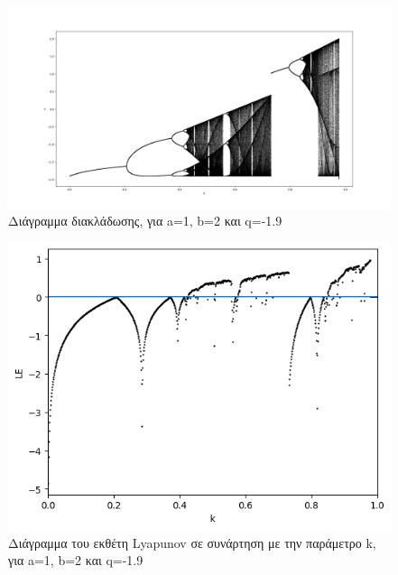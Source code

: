 \begin{figure}[h!]
	\centering
	\includegraphics[width=0.8\linewidth]{LateX images/graphs q19/g1}
	\caption{ Διάγραμμα διακλάδωσης, για a=1, b=2 και q=-1.9}
	\label{f:g39}
\end{figure}

\begin{figure}[h!]
	\centering
	\includegraphics[width=0.6\linewidth]{LateX images/graphs q19/g2}
	\caption{Διάγραμμα του εκθέτη Lyapunov σε συνάρτηση με την παράμετρο k, για a=1, b=2 και q=-1.9}
	\label{f:g40}
\end{figure}

